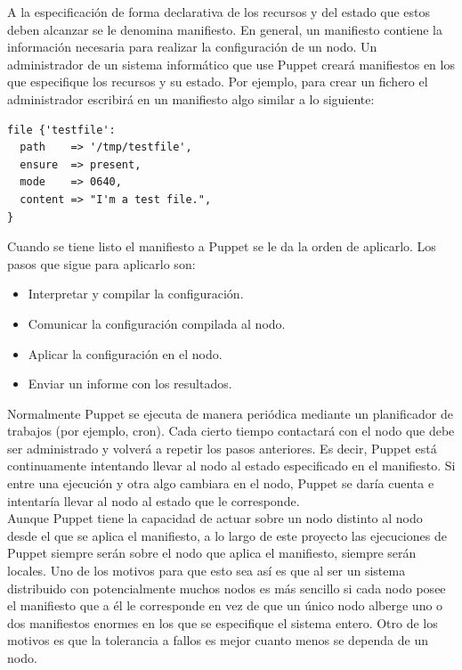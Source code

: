 A la especificación de forma declarativa de los recursos y del estado que estos deben alcanzar se le denomina manifiesto. En general, un manifiesto contiene la información necesaria para realizar la configuración de un nodo. Un administrador de un sistema informático que use Puppet creará manifiestos en los que especifique los recursos y su estado. Por ejemplo, para crear un fichero el administrador escribirá en un manifiesto algo similar a lo siguiente:

\pagebreak

\begin{lstlisting}
file {'testfile':
  path    => '/tmp/testfile',
  ensure  => present,
  mode    => 0640,
  content => "I'm a test file.",
}
\end{lstlisting}

Cuando se tiene listo el manifiesto a Puppet se le da la orden de aplicarlo. Los pasos que sigue para aplicarlo son:

\begin{itemize}
\item Interpretar y compilar la configuración.
\item Comunicar la configuración compilada al nodo.
\item Aplicar la configuración en el nodo.
\item Enviar un informe con los resultados.
\end{itemize}


Normalmente Puppet se ejecuta de manera periódica mediante un planificador de trabajos (por ejemplo, cron). Cada cierto tiempo contactará con el nodo que debe ser administrado y volverá a repetir los pasos anteriores. Es decir, Puppet está continuamente intentando llevar al nodo al estado especificado en el manifiesto. Si entre una ejecución y otra algo cambiara en el nodo, Puppet se daría cuenta e intentaría llevar al nodo al estado que le corresponde. \\

Aunque Puppet tiene la capacidad de actuar sobre un nodo distinto al nodo desde el que se aplica el manifiesto, a lo largo de este proyecto las ejecuciones de Puppet siempre serán sobre el nodo que aplica el manifiesto, siempre serán locales. Uno de los motivos para que esto sea así es que al ser un sistema distribuido con potencialmente muchos nodos es más sencillo si cada nodo posee el manifiesto que a él le corresponde en vez de que un único nodo alberge uno o dos manifiestos enormes en los que se especifique el sistema entero. Otro de los motivos es que la tolerancia a fallos es mejor cuanto menos se dependa de un nodo.


